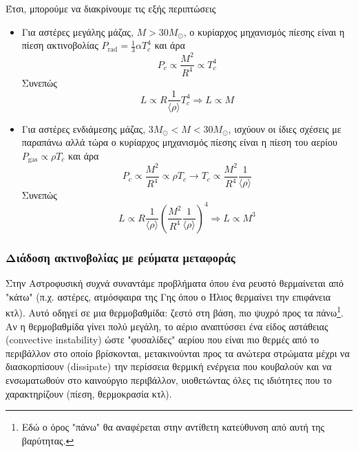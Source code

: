 Έτσι, μπορούμε να διακρίνουμε τις εξής περιπτώσεις
\begin{itemize}
    \item Για αστέρες μεγάλης μάζας, $M>30M_\odot$, ο κυρίαρχος μηχανισμός πίεσης είναι η πίεση ακτινοβολίας $P_{\text{rad}} = \frac{1}{3} \alpha T_c^4$ και άρα
    \begin{equation*}
        P_c \propto \frac{M^2}{R^4} \propto T_c^4
    \end{equation*}
    Συνεπώς
    \begin{equation}
        \label{eq:high_mass_LM_relationship}
        L \propto R \frac{1}{\langle \rho \rangle} T_c^4 \Rightarrow \boxed{L \propto M}
    \end{equation}
    
    \item Για αστέρες ενδιάμεσης μάζας, $3M_\odot < M < 30M_\odot$, ισχύουν οι ίδιες σχέσεις με παραπάνω αλλά τώρα ο κυρίαρχος μηχανισμός πίεσης είναι η πίεση του αερίου $P_{\text{gas}} \propto \rho T_c$ και άρα
    \begin{equation*}
        P_c \propto \frac{M^2}{R^4} \propto \rho T_c \longrightarrow T_c \propto \frac{M^2}{R^4} \frac{1}{\langle \rho \rangle}
    \end{equation*}
    Συνεπώς
    \begin{equation}
        \label{eq:intermediate_mass_LM_relationship}
        L \propto R \frac{1}{\langle \rho \rangle} \left(\frac{M^2}{R^4} \frac{1}{\langle \rho \rangle} \right)^4 \Rightarrow \boxed{L \propto M^3}
    \end{equation}
\end{itemize}
\subsubsection{Διάδοση ακτινοβολίας με ρεύματα μεταφοράς}
Στην Αστροφυσική συχνά συναντάμε προβλήματα όπου ένα ρευστό θερμαίνεται από "κάτω" (π.χ. αστέρες, ατμόσφαιρα της Γης όπου ο Ήλιος θερμαίνει την επιφάνεια κτλ). Αυτό οδηγεί σε μια θερμοβαθμίδα: ζεστό στη βάση, πιο ψυχρό προς τα πάνω\footnote{Εδώ ο όρος "πάνω" θα αναφέρεται στην αντίθετη κατεύθυνση από αυτή της βαρύτητας.}. Αν η θερμοβαθμίδα γίνει πολύ μεγάλη, το αέριο αναπτύσσει ένα είδος αστάθειας (convective instability) ώστε "φυσαλίδες" αερίου που είναι πιο θερμές από το περιβάλλον στο οποίο βρίσκονται, μετακινούνται προς τα ανώτερα στρώματα μέχρι να διασκορπίσουν (dissipate) την περίσσεια θερμική ενέργεια που κουβαλούν και να ενσωματωθούν στο καινούργιο περιβάλλον, υιοθετώντας όλες τις ιδιότητες που το χαρακτηρίζουν (πίεση, θερμοκρασία κτλ). 

